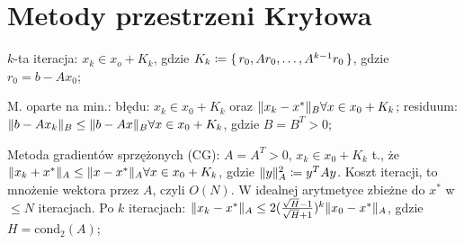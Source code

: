 \section{Metody przestrzeni Kryłowa}

\entry
$k$-ta iteracja:
$x_k\in x_o+K_k$,
gdzie $K_k\coloneqq \set{r_0, Ar_0,\ldots, A^{k-1}r_0}$,
gdzie $r_0=b-Ax_0$;

\entry
M. oparte na min.:
błędu:
$x_k\in x_0 +K_k$ oraz $\|x_k - x^*\|_B \forall x\in x_0 + K_k$;
residuum:
$\|b-Ax_k\|_B \leq \|b-Ax\|_B \forall x\in x_0 +K_k$, gdzie $B=B^T>0$;

\entry
Metoda gradientów sprzężonych (CG):
$A=A^T>0$, $x_k\in x_0 + K_k$ t.,
że $\|x_k+x^*\|_A\leq \|x-x^*\|_A \forall x\in x_0 + K_k$,
gdzie $\|y\|^2_A \coloneqq y^TAy$.
Koszt iteracji, to mnożenie wektora przez $A$, czyli $O(N)$.
W idealnej arytmetyce zbieżne do $x^*$ w $\leq N$ iteracjach.
Po $k$ iteracjach:
$\|x_k - x^*\|_A\leq 2(\frac{\sqrt{H} - 1}{\sqrt{H} + 1})^k\|x_0-x^*\|_A$,
gdzie $H=\mathrm{cond}_2(A)$;

